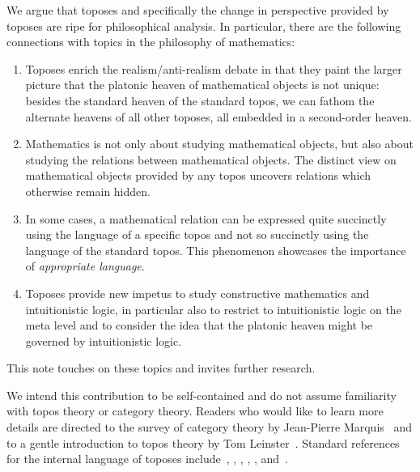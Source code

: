 \documentclass[oneside,reqno]{amsart}
\theoremstyle{definition}
\theoremstyle{plain}
\theoremstyle{remark}
\renewcommand{\_}{\mathpunct{.}\,}
\newcommand{\?}{\,{:}\,}
\begin{document}
We argue that toposes and specifically the change in perspective provided by
toposes are ripe for philosophical analysis. In particular, there are the
following connections with topics in the philosophy of mathematics:
\begin{enumerate}
\item Toposes enrich the realism/anti-realism debate in that they paint the larger
picture that the platonic heaven of mathematical objects is not unique: besides
the standard heaven of the standard topos, we can fathom the alternate
heavens of all other toposes, all embedded in a second-order heaven.
\item Mathematics is not only about studying mathematical objects, but also
about studying the relations between mathematical objects. The distinct view
on mathematical objects provided by any topos uncovers relations which
otherwise remain hidden.
\item In some cases, a mathematical relation can be expressed quite succinctly
using the language of a specific topos and not so succinctly using the language
of the standard topos. This phenomenon showcases the importance of
\emph{appropriate language}.
\item Toposes provide new impetus to study constructive mathematics and
intuitionistic logic, in particular also to restrict to intuitionistic
logic on the meta level and to consider the idea that the platonic heaven might
be governed by intuitionistic logic.
\end{enumerate}
This note touches on these topics and invites further research.

We intend this contribution to be self-contained and do not assume familiarity with
topos theory or category theory. Readers who would like to learn more details
are directed to the survey of category theory by Jean-Pierre
Marquis~\cite{sep:category-theory} and to a gentle introduction to topos theory
by Tom Leinster~\cite{leinster:introduction}. Standard references for the internal
language of toposes include~\cite[Chapter~VI]{moerdijk-maclane:sheaves-logic},
\cite[Chapter~14]{goldblatt:topoi},
\cite{caramello:preliminaries}, \cite{streicher:ctcl}, \cite{shulman:categorical-logic},
\cite[Chapter~6]{borceux:handbook3} and~\cite[Part~D]{johnstone:elephant}.

\bigskip
\end{document}
